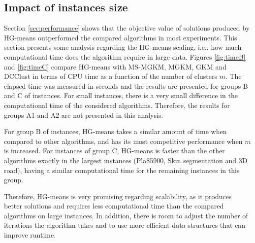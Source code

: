 \subsection{Impact of instances size}
Section \ref{sec:performance} shows that the objective value of solutions produced by HG-means outperformed the compared algorithms in most experiments. This section presents some analysis regarding the HG-means scaling, i.e., how much computational time does the algorithm require in large data. Figures \ref{fig:timeB} and \ref{fig:timeC} compare HG-means with MS-MGKM, MGKM, GKM and DCClust in terms of CPU time as a function of the number of clusters $m$. The elapsed time was measured in seconds and the results are presented for groups B and C of instances. For small instances, there is a very small difference in the computational time of the considered algorithms. Therefore, the results for groups A1 and A2 are not presented in this analysis.

For group B of instances, HG-means takes a similar amount of time when compared to other algorithms, and has its most competitive performance when $m$ is increased. For instances of group C, HG-means is faster than the other algorithms exactly in the largest instances (Pla85900, Skin segmentation and 3D road), having a similar computational time for the remaining instances in this group.

Therefore, HG-means is very promising regarding scalability, as it produces better solutions and requires less computational time than the compared algorithms on large instances. In addition, there is room to adjust the number of iterations the algorithm takes and to use more efficient data structures that can improve runtime.

%

